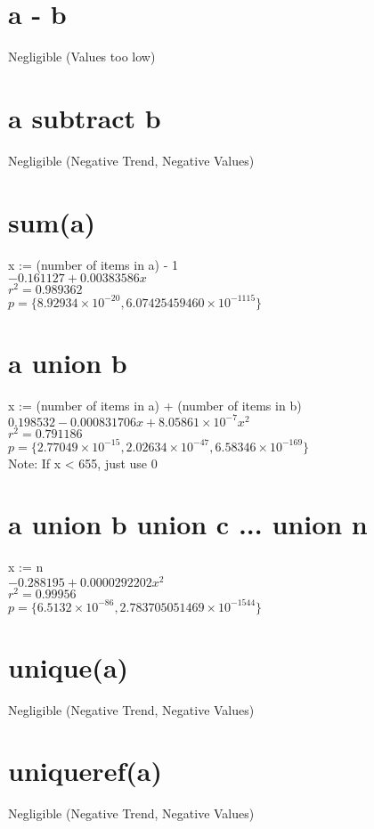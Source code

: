 \documentclass[12pt]{article}
\begin{document}
	\section{a - b}
	Negligible (Values too low)
	
	\section{a subtract b}
	Negligible (Negative Trend, Negative Values)
	
	\section{sum(a)}
	x := (number of items in a) - 1\\
	$-0.161127 + 0.00383586 x$\\
	$r^2 = 0.989362$\\
	$p = \{8.92934 \times 10^{-20}, 6.07425459460 \times 10^{-1115}\}$
	
	\section{a union b}
	x := (number of items in a) + (number of items in b)\\
	$0.198532 - 0.000831706 x + 8.05861 \times 10^{-7} x^2$\\
	$r^2 = 0.791186$\\
	$p = \{2.77049 \times 10^{-15}, 2.02634 \times 10^{-47}, 6.58346 \times 10^{-169}\}$\\
	Note: If x < 655, just use 0
	
	\section{a union b union c ... union n}
	x := n\\
	$-0.288195 + 0.0000292202 x^2$\\
	$r^2 = 0.99956$\\
	$p = \{6.5132 \times 10^{-86}, 2.783705051469 \times 10^{-1544}\}$
	
	\section{unique(a)}
	Negligible (Negative Trend, Negative Values)
	
	\section{uniqueref(a)}
	Negligible (Negative Trend, Negative Values)
	
\end{document}
